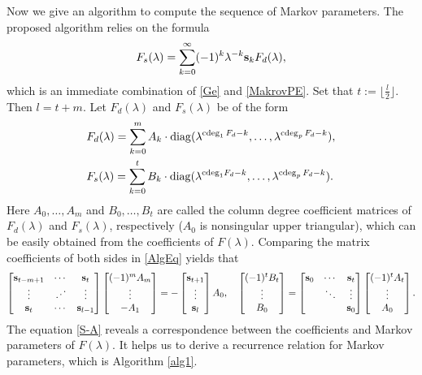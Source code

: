 \documentclass[12pt,reqno]{amsart}
\theoremstyle{plain}
\numberwithin{equation}{section}
\theoremstyle{remark}
\begin{document}
Now we give an algorithm to compute the sequence of Markov parameters. The proposed algorithm relies on the formula 
\begin{equation}\label{AlgEq}
F_{s}(\lambda)=\sum_{k=0}^{\infty} (-1)^{k}\lambda^{-k}{\bf s}_k F_{d}(\lambda),
\end{equation}
which is an immediate combination of \eqref{Ge} and \eqref{MakrovPE}. 
Set that
$t:=\lfloor\tfrac{l}{2}\rfloor
$. Then $l=t+m$. Let
$F_d(\lambda)$ and $F_s(\lambda)$ be  of the form 
\begin{align}
&F_d(\lambda)=\sum_{k=0}^{m} A_{k}\cdot {\rm diag}(\lambda^{{\rm cdeg}_1\,F_d-k},\ldots,\lambda^{{\rm cdeg}_p\,F_d-k}), \label{A} \\
&F_s(\lambda)=\sum_{k=0}^{t}B
_{k}\cdot {\rm diag}(\lambda^{{\rm cdeg}_1F_d-k},\ldots,\lambda^{{\rm cdeg}_p\,F_d-k}).\label{B}
\end{align}
Here $A_0, \ldots, A_m$ and $B_0, \ldots, B_t$ are called the  column degree coefficient matrices  of $F_d(\lambda)$ and $F_s(\lambda)$, respectively ($A_0$ is nonsingular upper triangular), which can be easily obtained from the coefficients of $F(\lambda)$.  Comparing the matrix coefficients of both sides in \eqref{AlgEq} yields that 
\begin{equation}\label{S-A}
\begin{bmatrix}
{\bf s}_{t-m+1} & \cdots & {\bf s}_{t}\\
\vdots & \iddots & \vdots\\
{\bf s}_{t} & \cdots & {\bf s}_{l-1}
\end{bmatrix} \begin{bmatrix}
(-1)^{m}A_m\\
\vdots\\
-A_1
\end{bmatrix}=-\begin{bmatrix}
{\bf s}_{t+1}\\
\vdots\\
{\bf s}_{l}
\end{bmatrix}A_0,\quad 
\begin{bmatrix}
(-1)^t B_{t}\\
\vdots\\ 
B_{0}
\end{bmatrix}=
\begin{bmatrix}
{\bf s}_0 & \cdots & {\bf s}_{t}\\
 & \ddots & \vdots\\
& & {\bf s}_0
\end{bmatrix}\begin{bmatrix}
(-1)^t A_t\\
\vdots\\
A_0
\end{bmatrix}.
\end{equation}
The equation \eqref{S-A} reveals a correspondence between
the coefficients and Markov parameters of $F(\lambda)$.
It helps us to derive a recurrence relation for Markov parameters, which is Algorithm \ref{alg1}. 
\end{document}
